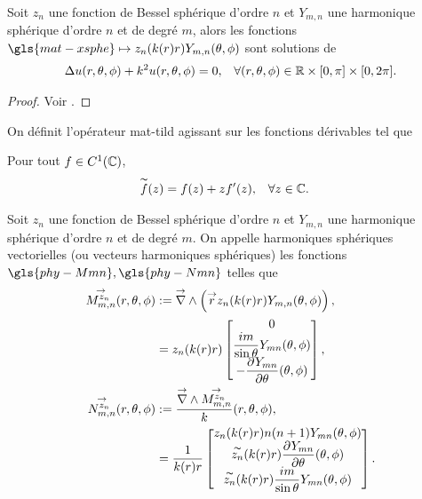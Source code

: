     \begin{prop}
        Soit \(z_n\) une fonction de Bessel sphérique d'ordre \(n\) et \(Y_{m,n}\) une harmonique sphérique d'ordre \(n\) et de degré \(m\), alors les fonctions \(\gls{mat-xsphe} \mapsto z_n(k(r)r)Y_{m,n}(\tp)\) sont solutions de 
        \begin{align*}
            \Delta u(r,\theta,\phi) + k^2u(r,\theta,\phi) = 0, && \forall (r,\theta,\phi) \in \mathbb R\times[0,\pi]\times[0,2\pi].
        \end{align*}
    \end{prop}
    \begin{proof}
        Voir \cite[section.~2.6.1]{nedelec_acoustic_2001}.
    \end{proof}

    \begin{defn}
        On définit l’opérateur \gls{mat-tild} agissant sur les fonctions dérivables tel que
        
        Pour tout \(f \in C^1(\mathbb C)\), 
        \begin{align*}
            &\overset{\thicksim}{f}(z) = f(z) + zf'(z), && \forall z \in \mathbb C.
        \end{align*}
    \end{defn}

    \begin{defn}
        \label{def:sphere:harmoniques_spheriques_vect}
        Soit \(z_n\) une fonction de Bessel sphérique d'ordre \(n\) et \(Y_{m,n}\) une harmonique sphérique d'ordre \(n\) et de degré \(m\).
        On appelle harmoniques sphériques vectorielles (ou vecteurs harmoniques sphériques) les fonctions \(\gls{phy-Mmn},\gls{phy-Nmn}\) telles que
        \begin{align}
            \label{eq:defMmn}
            \Mmn[z_n](\rtp) &:= \vrot \left( \vect{r} z_n(k(r)r) Y_{m,n}(\tp) \right),
            \\
            \notag&= z_n(k(r)r)
            \begin{bmatrix}
                0
                \\
                \frac{im}{\sin\theta}Y_{mn}(\tp)
                \\
                - \ddr{\theta}{Y_{mn}}(\tp)
            \end{bmatrix},
            \\
            \label{eq:defNnn}
            \Nmn[z_n](\rtp) &:= \frac{\vrot \Mmn[z_n]}{k}(\rtp),
            \\
            \notag&= \frac{1}{k(r)r}
            \begin{bmatrix}
                z_n(k(r)r)n(n+1)Y_{mn}(\tp)
                \\
                \tilde{z_n}(k(r)r)\ddr{\theta}{Y_{mn}}(\tp)
                \\
                \tilde{z_n}(k(r)r)\frac{im}{\sin\theta}Y_{mn}(\tp)
            \end{bmatrix}.
        \end{align}
    \end{defn}


